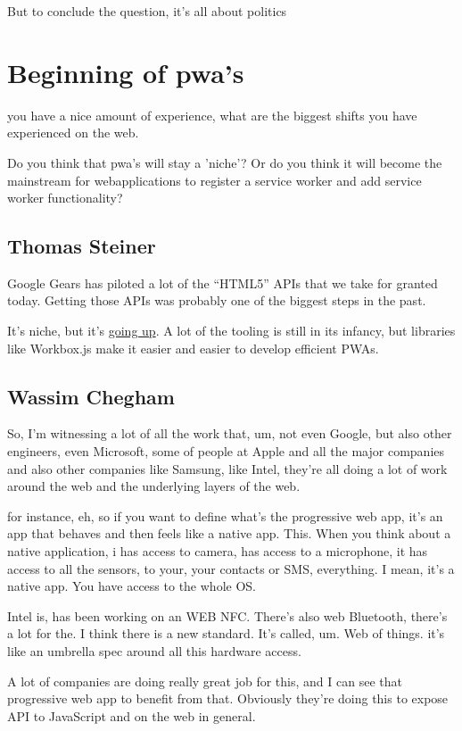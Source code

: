			But to conclude the question, it's all about politics
		
	\section{Beginning of pwa's}
		you have a nice amount of experience, what are the biggest shifts you have experienced on the web. 
		
		Do you think that pwa's will stay a 'niche'? Or do you think it will become the mainstream for webapplications to register a service worker and add service worker functionality?
		\subsection{Thomas Steiner}
			Google Gears has piloted a lot of the “HTML5” APIs that we take for granted today. Getting those APIs was probably one of the biggest steps in the past.
			
			It’s niche, but it’s \href{https://httparchive.org/reports/progressive-web-apps#swControlledPages}{going up}. A lot of the tooling is still in its infancy, but libraries like Workbox.js make it easier and easier to develop efficient PWAs.
		
		\subsection{Wassim Chegham}
			So, I'm witnessing a lot of all the work that, um, not even Google, but also other engineers, even Microsoft, some of people at Apple and all the major companies and also other companies like Samsung, like Intel, they're all doing a lot of work around the web and the underlying layers of the web.
			
			for instance, eh, so if you want to define what's the progressive web app, it's an app that behaves and then feels like a native app. This. When you think about a native application, i has access to camera, has access to a microphone, it has access to all the sensors, to your, your contacts or SMS, everything. I mean, it's a native app. You have access to the whole OS.
			
			Intel is, has been working on an WEB NFC. There's also web Bluetooth, there's a lot for the. I think there is a new standard. It's called, um. Web of things. it's like an umbrella spec around all this hardware access.
			
			A lot of companies are doing really great job for this, and I can see that progressive web app to benefit from that. Obviously they're doing this to expose API to JavaScript and on the web in general. 
			
